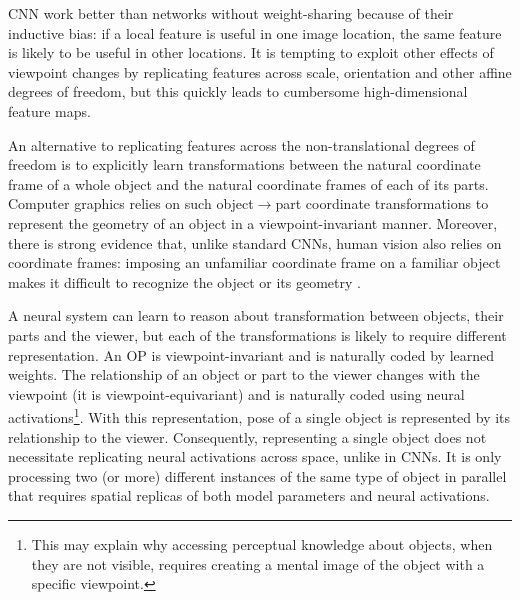 % 
\Gls{CNN} work better than networks without weight-sharing because of their inductive bias: if a local feature is useful in one image location, the same feature is likely to be useful in other locations. It is tempting to exploit other effects of viewpoint changes by replicating features across scale, orientation and other affine degrees of freedom, but this quickly leads to cumbersome high-dimensional feature maps. %

An alternative to replicating features across the non-translational degrees of freedom is to explicitly learn transformations between the natural coordinate frame of a whole object and the natural coordinate frames of each of its parts.   Computer graphics relies on such object$\rightarrow$part coordinate transformations to represent the geometry of an object in a viewpoint-invariant manner. Moreover, there is strong evidence that, unlike standard \gls{CNN}s, human vision also relies on coordinate frames: imposing an unfamiliar coordinate frame on a familiar object makes it difficult to recognize the object or its geometry \citep{Rock73, Hinton79}.

A neural system can learn to reason about transformation between objects, their parts and the viewer, but each of the transformations is likely to require different representation.
An \gls{OP} is viewpoint-invariant and is naturally coded by learned weights.  
The relationship of an object or part to the viewer changes with the viewpoint (it is viewpoint-equivariant) and is naturally coded using neural activations\footnote{
    This may explain why accessing perceptual knowledge about objects, when they are not visible, requires creating a mental image of the object with a specific viewpoint.
}.
With this representation, pose of a single object is represented by its relationship to the viewer.
Consequently, representing a single object does not necessitate replicating neural activations across space, unlike in \glspl{CNN}.
It is only processing two (or more) different instances of the same type of object in parallel that requires spatial replicas of both model parameters and neural activations.

